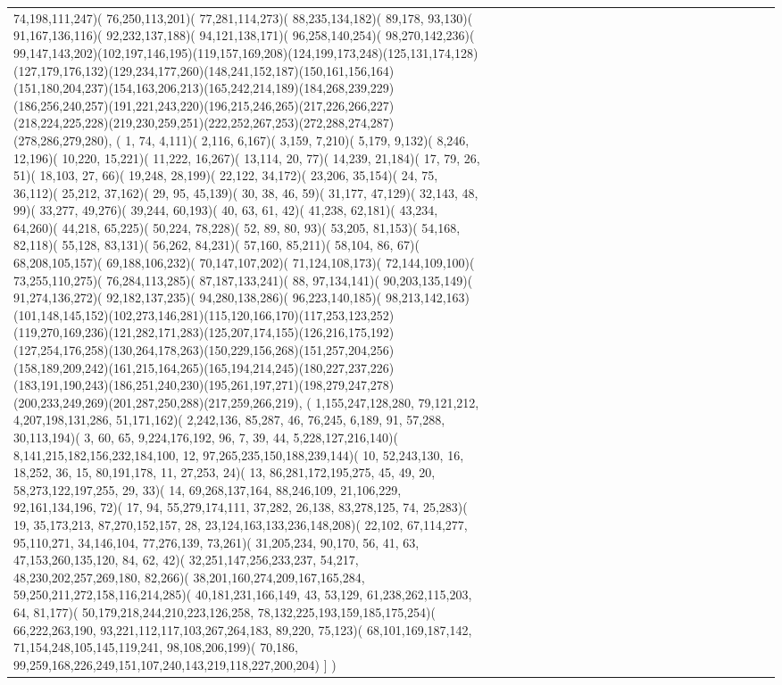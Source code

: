 \documentclass[varwidth=\maxdimen,border=10]{standalone}
\begin{document}
\begin{tabular}{@{}l@{}l@{}l@{}l@{}l@{}l@{}l@{}l@{}l@{}l@{}l@{}l@{}l@{}l@{}l@{}l@{}l@{}l@{}l@{}l@{}l@{}l@{}l@{}l@{}}
74,198,111,247)( 76,250,113,201)( 77,281,114,273)( 88,235,134,182)( 89,178, 93,130)( 91,167,136,116)( 92,232,137,188)( 94,121,138,171)( 96,258,140,254)( 98,270,142,236)( 99,147,143,202)(102,197,146,195)(119,157,169,208)(124,199,173,248)(125,131,174,128)(127,179,176,132)(129,234,177,260)(148,241,152,187)(150,161,156,164)(151,180,204,237)(154,163,206,213)(165,242,214,189)(184,268,239,229)(186,256,240,257)(191,221,243,220)(196,215,246,265)(217,226,266,227)(218,224,225,228)(219,230,259,251)(222,252,267,253)(272,288,274,287)(278,286,279,280), (  1, 74,  4,111)(  2,116,  6,167)(  3,159,  7,210)(  5,179,  9,132)(  8,246, 12,196)( 10,220, 15,221)( 11,222, 16,267)( 13,114, 20, 77)( 14,239, 21,184)( 17, 79, 26, 51)( 18,103, 27, 66)( 19,248, 28,199)( 22,122, 34,172)( 23,206, 35,154)( 24, 75, 36,112)( 25,212, 37,162)( 29, 95, 45,139)( 30, 38, 46, 59)( 31,177, 47,129)( 32,143, 48, 99)( 33,277, 49,276)( 39,244, 60,193)( 40, 63, 61, 42)( 41,238, 62,181)( 43,234, 64,260)( 44,218, 65,225)( 50,224, 78,228)( 52, 89, 80, 93)( 53,205, 81,153)( 54,168, 82,118)( 55,128, 83,131)( 56,262, 84,231)( 57,160, 85,211)( 58,104, 86, 67)( 68,208,105,157)( 69,188,106,232)( 70,147,107,202)( 71,124,108,173)( 72,144,109,100)( 73,255,110,275)( 76,284,113,285)( 87,187,133,241)( 88, 97,134,141)( 90,203,135,149)( 91,274,136,272)( 92,182,137,235)( 94,280,138,286)( 96,223,140,185)( 98,213,142,163)(101,148,145,152)(102,273,146,281)(115,120,166,170)(117,253,123,252)(119,270,169,236)(121,282,171,283)(125,207,174,155)(126,216,175,192)(127,254,176,258)(130,264,178,263)(150,229,156,268)(151,257,204,256)(158,189,209,242)(161,215,164,265)(165,194,214,245)(180,227,237,226)(183,191,190,243)(186,251,240,230)(195,261,197,271)(198,279,247,278)(200,233,249,269)(201,287,250,288)(217,259,266,219), (  1,155,247,128,280, 79,121,212,  4,207,198,131,286, 51,171,162)(  2,242,136, 85,287, 46, 76,245,  6,189, 91, 57,288, 30,113,194)(  3, 60, 65,  9,224,176,192, 96,  7, 39, 44,  5,228,127,216,140)(  8,141,215,182,156,232,184,100, 12, 97,265,235,150,188,239,144)( 10, 52,243,130, 16, 18,252, 36, 15, 80,191,178, 11, 27,253, 24)( 13, 86,281,172,195,275, 45, 49, 20, 58,273,122,197,255, 29, 33)( 14, 69,268,137,164, 88,246,109, 21,106,229, 92,161,134,196, 72)( 17, 94, 55,279,174,111, 37,282, 26,138, 83,278,125, 74, 25,283)( 19, 35,173,213, 87,270,152,157, 28, 23,124,163,133,236,148,208)( 22,102, 67,114,277, 95,110,271, 34,146,104, 77,276,139, 73,261)( 31,205,234, 90,170, 56, 41, 63, 47,153,260,135,120, 84, 62, 42)( 32,251,147,256,233,237, 54,217, 48,230,202,257,269,180, 82,266)( 38,201,160,274,209,167,165,284, 59,250,211,272,158,116,214,285)( 40,181,231,166,149, 43, 53,129, 61,238,262,115,203, 64, 81,177)( 50,179,218,244,210,223,126,258, 78,132,225,193,159,185,175,254)( 66,222,263,190, 93,221,112,117,103,267,264,183, 89,220, 75,123)( 68,101,169,187,142, 71,154,248,105,145,119,241, 98,108,206,199)( 70,186, 99,259,168,226,249,151,107,240,143,219,118,227,200,204) ] )

\end{tabular}
\end{document}
